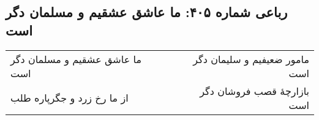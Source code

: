 \begin{center}
\section*{رباعی شماره ۴۰۵: ما عاشق عشقیم و مسلمان دگر است}
\label{sec:0405}
\begin{longtable}{l p{0.5cm} r}
ما عاشق عشقیم و مسلمان دگر است
&&
مامور ضعیفیم و سلیمان دگر است
\\
از ما رخ زرد و جگرپاره طلب
&&
بازارچهٔ قصب فروشان دگر است
\\
\end{longtable}
\end{center}
